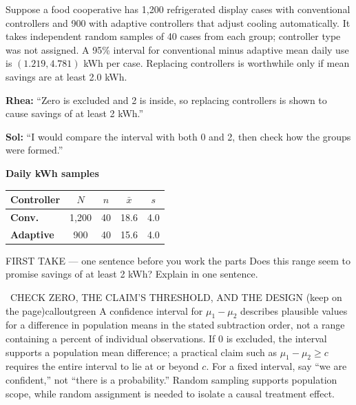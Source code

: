 \documentclass[11pt]{article}
\begin{document}


Suppose a food cooperative has 1{,}200 refrigerated display cases with conventional controllers and 900 with adaptive controllers that adjust cooling automatically. It takes independent random samples of 40 cases from each group; controller type was not assigned. A 95\% interval for conventional minus adaptive mean daily use is $(1.219,4.781)$ kWh per case. Replacing controllers is worthwhile only if mean savings are at least 2.0 kWh.\par\smallskip \textbf{Rhea:} ``Zero is excluded and 2 is inside, so replacing controllers is shown to cause savings of at least 2 kWh.''\par \textbf{Sol:} ``I would compare the interval with both 0 and 2, then check how the groups were formed.''\par
\begin{center}
\textbf{Daily kWh samples}\par\smallskip
\begin{tabular}{|l|c|c|c|c|}
\hline
\textbf{Controller} & \textbf{$N$} & \textbf{$n$} & \textbf{$\bar x$} & \textbf{$s$} \\ \hline
\textbf{Conv.} & 1,200 & 40 & 18.6 & 4.0 \\ \hline
\textbf{Adaptive} & 900 & 40 & 15.6 & 4.0 \\ \hline
\end{tabular}
\end{center}
\begin{firsttakebox}{FIRST TAKE --- one sentence before you work the parts}
Does this range seem to promise savings of at least 2 kWh? Explain in one sentence.
\workspace{0.9in}
\end{firsttakebox}

\begin{callout}{\IconBook\ CHECK ZERO, THE CLAIM'S THRESHOLD, AND THE DESIGN (keep on the page)}{calloutgreen}
A confidence interval for $\mu_1-\mu_2$ describes plausible values for a difference in
population means in the stated subtraction order, not a range containing a percent of individual
observations. If 0 is excluded, the interval supports a population mean difference; a practical
claim such as $\mu_1-\mu_2\geq c$ requires the entire interval to lie at or beyond $c$.
For a fixed interval, say ``we are confident,'' not ``there is a probability.'' Random sampling
supports population scope, while random assignment is needed to isolate a causal treatment effect.
\end{callout}
\end{document}
